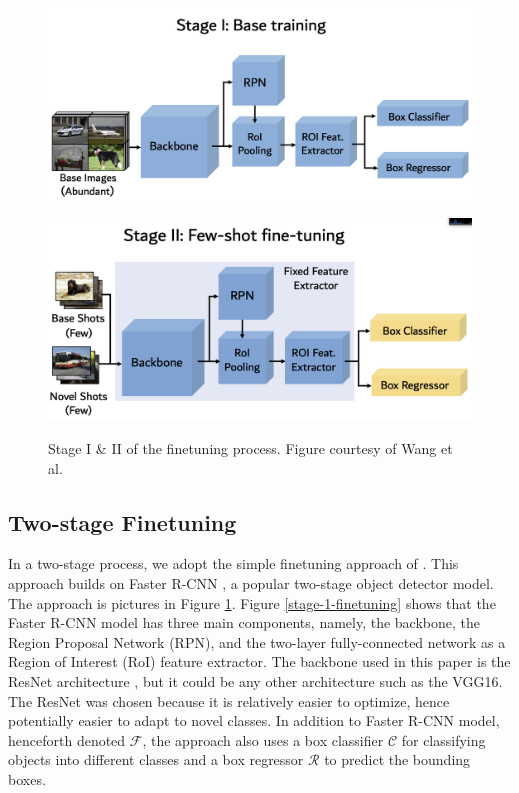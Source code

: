 \documentclass{article}
\begin{document}
\begin{figure}[h]
  \begin{minipage}{0.47\textwidth}
  \includegraphics[width=\textwidth, height=0.17\textheight]{./../../figures/fs_det/s1_finetuning.png}
  \label{stage-1-finetuning}
  \end{minipage}
  \begin{minipage}{0.47\textwidth}
  \includegraphics[width=\textwidth, height=0.17\textheight]{./../../figures/fs_det/s2_finetuning.png}
  \label{stage-2-finetuning}
  \end{minipage}
  \caption{Stage I \& II of  the finetuning process. Figure courtesy of Wang et al. }
  \label{finetuning}
\end{figure}

\subsection{Two-stage Finetuning}
In a two-stage process, we adopt the simple finetuning approach of \cite{wang2020frustratingly}. 
This approach builds on Faster R-CNN \cite{ren2015faster}, a popular two-stage object detector model. 
The approach is pictures in Figure \ref{finetuning}.  
Figure \ref{stage-1-finetuning} shows that the Faster R-CNN model has three main components, namely, 
the backbone, the Region Proposal Network (RPN), and the two-layer fully-connected network as a 
Region of Interest (RoI) feature extractor.  
The backbone used in this paper is the ResNet architecture \cite{he2016deep}, but it could be any other 
architecture such as the VGG16. The ResNet was chosen because it is relatively easier to optimize,
hence potentially easier to adapt to novel classes. 
In addition to Faster R-CNN model, henceforth denoted $\mathcal{F}$, the approach also uses a box 
classifier $\mathcal{C}$ for classifying objects into different classes and a box regressor $\mathcal{R}$
to predict the bounding boxes. 
\end{document}
